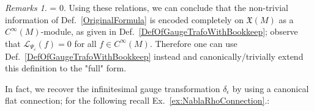 \documentclass[a4paper,oneside,11pt]{scrartcl} %
\theoremstyle{plain}
\theoremstyle{remark}
\newtheorem{remark}[theorem]{Remarks}
\theoremstyle{definition}
\begin{document}
\begin{remark}
=
0.
\eas
Using these relations, we can conclude that the non-trivial information of Def.~\eqref{OriginalFormula} is encoded completely on $\mathfrak{X}(M)$ as a $C^\infty(M)$-module, as given in Def.~\eqref{DefOfGaugeTrafoWithBookkeep}; observe that $\mathcal{L}_{\Psi_\varepsilon}(f) = 0$ for all $f \in C^\infty(M)$. Therefore one can use Def.~\eqref{DefOfGaugeTrafoWithBookkeep} instead and canonically/trivially extend this definition to the "full" form.
%
\end{remark}

In fact, we recover the infinitesimal gauge transformation $\delta_\epsilon$ by using a canonical flat connection; for the following recall Ex.~\ref{ex:NablaRhoConnection}.:
\end{document}
